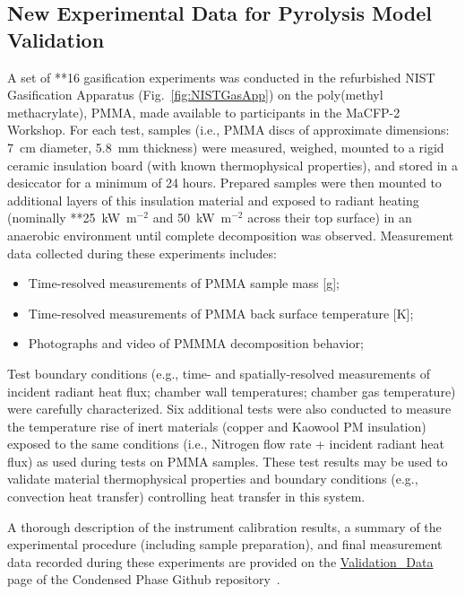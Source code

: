 \documentclass[12pt]{article}
\begin{document}
\subsection{New Experimental Data for Pyrolysis Model Validation}
A set of **16 gasification experiments was conducted in the refurbished NIST Gasification Apparatus (Fig.~\ref{fig:NISTGasApp}) on the poly(methyl methacrylate), PMMA, made available to participants in the MaCFP-2 Workshop. For each test, samples (i.e., PMMA discs of approximate dimensions: 7~cm diameter, 5.8~mm thickness) were measured, weighed, mounted to a rigid ceramic insulation board (with known thermophysical properties), and stored in a desiccator for a minimum of 24 hours. Prepared samples were then mounted to additional layers of this insulation material and exposed to radiant heating (nominally **25~kW~m$^{-2}$ and 50~kW~m$^{-2}$ across their top surface) in an anaerobic environment until complete decomposition was observed. Measurement data collected during these experiments includes:
\begin{itemize}[noitemsep]
\item Time-resolved measurements of PMMA sample mass [g];
\item Time-resolved measurements of PMMA back surface temperature [K];
\item Photographs and video of PMMMA decomposition behavior;
\end{itemize}

Test boundary conditions (e.g., time- and spatially-resolved measurements of incident radiant heat flux; chamber wall temperatures; chamber gas temperature) were carefully characterized. Six additional tests were also conducted to measure the temperature rise of inert materials (copper and Kaowool PM insulation) exposed to the same conditions (i.e., Nitrogen flow rate + incident radiant heat flux) as used during tests on PMMA samples. These test results may be used to validate material thermophysical properties and boundary conditions (e.g., convection heat transfer) controlling heat transfer in this system.

A thorough description of the instrument calibration results, a summary of the experimental procedure (including sample preparation), and final measurement data recorded during these experiments are provided on the \href{https://github.com/MaCFP/matl-db/tree/master/PMMA/Validation_Data/NIST_Gasification_Apparatus}{Validation\_Data} page of the Condensed Phase Github repository~\cite{MaCFP-cond-db}.
\end{document}
